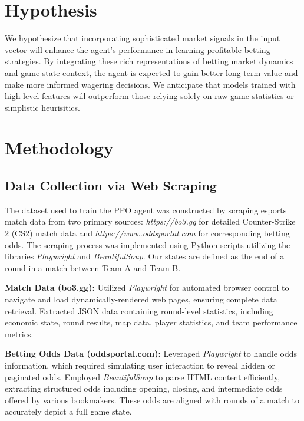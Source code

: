 \documentclass[sigconf]{acmart}
\begin{document}
\section{Hypothesis}

We hypothesize that incorporating sophisticated market signals in the input vector will enhance the agent's performance in learning profitable betting strategies. By integrating these rich representations of betting market dynamics and game-state context, the agent is expected to gain better long-term value and make more informed wagering decisions. We anticipate that models trained with high-level features will outperform those relying solely on raw game statistics or simplistic heurisitics.

\section{Methodology}

\subsection{Data Collection via Web Scraping}
The dataset used to train the PPO agent was constructed by scraping esports match data from two primary sources: \textit{https://bo3.gg} for detailed Counter-Strike 2 (CS2) match data and \textit{https://www.oddsportal.com} for corresponding betting odds. The scraping process was implemented using Python scripts utilizing the libraries \textit{Playwright} and \textit{BeautifulSoup}. Our states are defined as the end of a round in a match between Team A and Team B.

\bigskip

\textbf{Match Data (bo3.gg):}
Utilized \textit{Playwright} for automated browser control to navigate and load dynamically-rendered web pages, ensuring complete data retrieval.
Extracted JSON data containing round-level statistics, including economic state, round results, map data, player statistics, and team performance metrics.

\bigskip

\textbf{Betting Odds Data (oddsportal.com):}
Leveraged \textit{Playwright} to handle odds information, which required simulating user interaction to reveal hidden or paginated odds. Employed \textit{BeautifulSoup} to parse HTML content efficiently, extracting structured odds including opening, closing, and intermediate odds offered by various bookmakers. These odds are aligned with rounds of a match to accurately depict a full game state.
\end{document}
